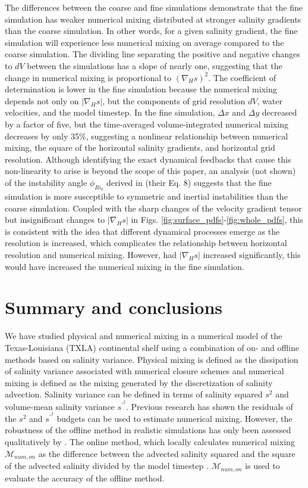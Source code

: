 The differences between the coarse and fine simulations demonstrate that the fine simulation has weaker numerical mixing distributed at stronger salinity gradients than the coarse simulation. In other words, for a given salinity gradient, the fine simulation will experience less numerical mixing on average compared to the coarse simulation. The dividing line separating the positive and negative changes to $dV$ between the simulations has a slope of nearly one, suggesting that the change in numerical mixing is proportional to $(\nabla_H s)^2$. The coefficient of determination is lower in the fine simulation because the numerical mixing depends not only on $|\nabla_H s|$, but the components of grid resolution $dV$, water velocities, and the model timestep. In the fine simulation, $\Delta x$ and $\Delta y$ decreased by a factor of five, but the time-averaged volume-integrated numerical mixing decreases by only 35$\%$, suggesting a nonlinear relationship between numerical mixing, the square of the horizontal salinity gradients, and horizontal grid resolution. Although identifying the exact dynamical feedbacks that cause this non-linearity to arise is beyond the scope of this paper, an analysis (not shown) of the instability angle $\phi_{{Ri}_b}$ derived in \citet{Thomas_2013} (their Eq. 8) suggests that the fine simulation is more susceptible to symmetric and inertial instabilities than the coarse simulation. Coupled with the sharp changes of the velocity gradient tensor but insignificant changes to $|\nabla_H s|$ in Figs. \ref{fig:surface_pdfs}-\ref{fig:whole_pdfs}, this is consistent with the idea that different dynamical processes emerge as the resolution is increased, which complicates the relationship between horizontal resolution and numerical mixing. However, had $|\nabla_H s|$ increased significantly, this would have increased the numerical mixing in the fine simulation.

\section{Summary and conclusions} \label{sec:conclusions}

We have studied physical and numerical mixing in a numerical model of the Texas-Louisiana (TXLA) continental shelf using a combination of on- and offline methods based on salinity variance. Physical mixing is defined as the dissipation of salinity variance associated with numerical closure schemes and numerical mixing is defined as the mixing generated by the discretization of salinity advection. Salinity variance can be defined in terms of salinity squared $s^2$ and volume-mean salinity variance $s^{\prime^2}$. Previous research \citep{Burchard_2019, MacCready_2018, Qu_2022_box} has shown the residuals of the $s^2$ and $s^{\prime^2}$ budgets can be used to estimate numerical mixing. However, the robustness of the offline method in realistic simulations has only been assessed qualitatively by \citet{Wang_2021}. The online method, which locally calculates numerical mixing $\mathcal{M}_{num, on}$ as the difference between the advected salinity squared and the square of the advected salinity divided by the model timestep \citep{Burchard_2008}. $\mathcal{M}_{num, on}$ is used to evaluate the accuracy of the offline method. 

